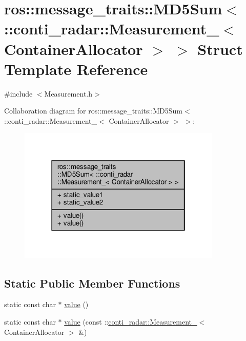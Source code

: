 \hypertarget{structros_1_1message__traits_1_1MD5Sum_3_01_1_1conti__radar_1_1Measurement___3_01ContainerAllocator_01_4_01_4}{}\section{ros\+:\+:message\+\_\+traits\+:\+:M\+D5\+Sum$<$ \+:\+:conti\+\_\+radar\+:\+:Measurement\+\_\+$<$ Container\+Allocator $>$ $>$ Struct Template Reference}
\label{structros_1_1message__traits_1_1MD5Sum_3_01_1_1conti__radar_1_1Measurement___3_01ContainerAllocator_01_4_01_4}


{\ttfamily \#include $<$Measurement.\+h$>$}



Collaboration diagram for ros\+:\+:message\+\_\+traits\+:\+:M\+D5\+Sum$<$ \+:\+:conti\+\_\+radar\+:\+:Measurement\+\_\+$<$ Container\+Allocator $>$ $>$\+:\nopagebreak
\begin{figure}[H]
\begin{center}
\leavevmode
\includegraphics[width=274pt]{d4/ded/structros_1_1message__traits_1_1MD5Sum_3_01_1_1conti__radar_1_1Measurement___3_01ContainerAllocator_01_4_01_4__coll__graph}
\end{center}
\end{figure}
\subsection*{Static Public Member Functions}
\begin{DoxyCompactItemize}
\item 
static const char $\ast$ \hyperlink{structros_1_1message__traits_1_1MD5Sum_3_01_1_1conti__radar_1_1Measurement___3_01ContainerAllocator_01_4_01_4_a2f4ad958d26adcc35db1efa902f4730a}{value} ()
\item 
static const char $\ast$ \hyperlink{structros_1_1message__traits_1_1MD5Sum_3_01_1_1conti__radar_1_1Measurement___3_01ContainerAllocator_01_4_01_4_a8c30ad15090eed764c724ade664e76ed}{value} (const \+::\hyperlink{structconti__radar_1_1Measurement__}{conti\+\_\+radar\+::\+Measurement\+\_\+}$<$ Container\+Allocator $>$ \&)
\end{DoxyCompactItemize}
